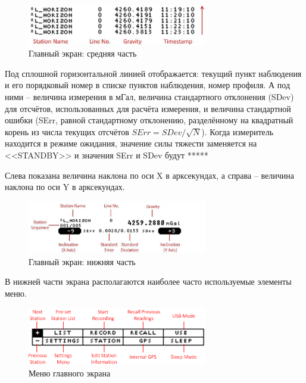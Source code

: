 \begin{figure}[h]
  \centering
  \includegraphics[width=0.7\textwidth]{figures/main_screen_middle_part}
  \caption{Главный экран: средняя часть}
  \label{fig:main_screen_middle_part}
\end{figure}

Под сплошной горизонтальной линией отображается: текущий пункт наблюдения и его
порядковый номер в списке пунктов наблюдения, номер профиля. А под ними –
величина измерения в мГал, величина стандартного отклонения (SDev) для отсчётов,
использованных для расчёта измерения, и величина стандартной ошибки (SErr,
равной стандартному отклонению, разделённому на квадратный корень из числа
текущих отсчётов $ SErr = SDev/\sqrt{N} $). Когда измеритель находится в режиме
ожидания, значение силы тяжести заменяется на <<STANDBY>> и значения SErr и SDev
будут *****

Слева показана величина наклона по оси X в арксекундах, а справа – величина
наклона по оси Y в арксекундах.

\begin{figure}[h]
  \centering
  \includegraphics[width=0.7\textwidth]{figures/main_screen_lower_part}
  \caption{Главный экран: нижняя часть}
  \label{fig:main_screen_lower_part}
\end{figure}

В нижней части экрана располагаются наиболее часто используемые элементы меню.

\begin{figure}[h]
  \centering
  \includegraphics[width=0.7\textwidth]{figures/main_screen_menu}
  \caption{Меню главного экрана}
  \label{fig:main_screen_menu}
\end{figure}

